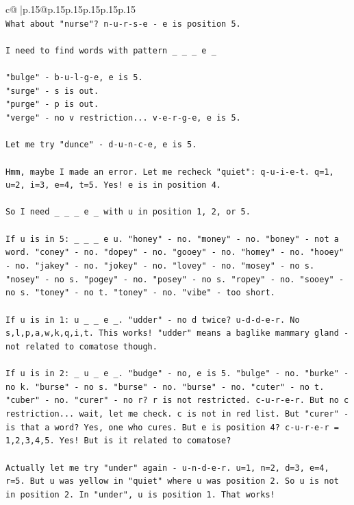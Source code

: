 \documentclass{article}
\begin{document}
{\begin{supertabular}{c@{$\;$}|p{.15\linewidth}@{}p{.15\linewidth}p{.15\linewidth}p{.15\linewidth}p{.15\linewidth}p{.15\linewidth}}
{{{\\ 
\texttt{What about "nurse"? n{-}u{-}r{-}s{-}e {-} e is position 5.} \\
\\ 
\texttt{I need to find words with pattern \_ \_ \_ e \_} \\
\\ 
\texttt{"bulge" {-} b{-}u{-}l{-}g{-}e, e is 5.} \\
\texttt{"surge" {-} s is out.} \\
\texttt{"purge" {-} p is out.} \\
\texttt{"verge" {-} no v restriction... v{-}e{-}r{-}g{-}e, e is 5.} \\
\\ 
\texttt{Let me try "dunce" {-} d{-}u{-}n{-}c{-}e, e is 5.} \\
\\ 
\texttt{Hmm, maybe I made an error. Let me recheck "quiet": q{-}u{-}i{-}e{-}t. q=1, u=2, i=3, e=4, t=5. Yes! e is in position 4.} \\
\\ 
\texttt{So I need \_ \_ \_ e \_ with u in position 1, 2, or 5.} \\
\\ 
\texttt{If u is in 5: \_ \_ \_ e u. "honey" {-} no. "money" {-} no. "boney" {-} not a word. "coney" {-} no. "dopey" {-} no. "gooey" {-} no. "homey" {-} no. "hooey" {-} no. "jakey" {-} no. "jokey" {-} no. "lovey" {-} no. "mosey" {-} no s. "nosey" {-} no s. "pogey" {-} no. "posey" {-} no s. "ropey" {-} no. "sooey" {-} no s. "toney" {-} no t. "toney" {-} no. "vibe" {-} too short.} \\
\\ 
\texttt{If u is in 1: u \_ \_ e \_. "udder" {-} no d twice? u{-}d{-}d{-}e{-}r. No s,l,p,a,w,k,q,i,t. This works! "udder" means a baglike mammary gland {-} not related to comatose though.} \\
\\ 
\texttt{If u is in 2: \_ u \_ e \_. "budge" {-} no, e is 5. "bulge" {-} no. "burke" {-} no k. "burse" {-} no s. "burse" {-} no. "burse" {-} no. "cuter" {-} no t. "cuber" {-} no. "curer" {-} no r? r is not restricted. c{-}u{-}r{-}e{-}r. But no c restriction... wait, let me check. c is not in red list. But "curer" {-} is that a word? Yes, one who cures. But e is position 4? c{-}u{-}r{-}e{-}r = 1,2,3,4,5. Yes! But is it related to comatose?} \\
\\ 
\texttt{Actually let me try "under" again {-} u{-}n{-}d{-}e{-}r. u=1, n=2, d=3, e=4, r=5. But u was yellow in "quiet" where u was position 2. So u is not in position 2. In "under", u is position 1. That works!} \\
}}}
\end{supertabular}}
\end{document}
